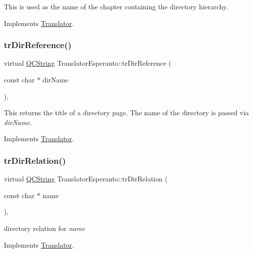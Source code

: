 This is used as the name of the chapter containing the directory hierarchy. 

Implements \mbox{\hyperlink{class_translator}{Translator}}.

\mbox{\label{class_translator_esperanto_af787100f1c4c7ddca5f6dffecda7dc74}} 
\subsubsection{\texorpdfstring{trDirReference()}{trDirReference()}}
{\footnotesize\ttfamily virtual \mbox{\hyperlink{class_q_c_string}{Q\+C\+String}} Translator\+Esperanto\+::tr\+Dir\+Reference (\begin{DoxyParamCaption}\item[{const char $\ast$}]{dir\+Name }\end{DoxyParamCaption})\hspace{0.3cm}{\ttfamily [inline]}, {\ttfamily [virtual]}}

This returns the title of a directory page. The name of the directory is passed via {\itshape dir\+Name}. 

Implements \mbox{\hyperlink{class_translator}{Translator}}.

\mbox{\label{class_translator_esperanto_a9d0c13df240c3d3ff1e691039ce0d60b}} 
\subsubsection{\texorpdfstring{trDirRelation()}{trDirRelation()}}
{\footnotesize\ttfamily virtual \mbox{\hyperlink{class_q_c_string}{Q\+C\+String}} Translator\+Esperanto\+::tr\+Dir\+Relation (\begin{DoxyParamCaption}\item[{const char $\ast$}]{name }\end{DoxyParamCaption})\hspace{0.3cm}{\ttfamily [inline]}, {\ttfamily [virtual]}}

directory relation for {\itshape name} 

Implements \mbox{\hyperlink{class_translator}{Translator}}.

